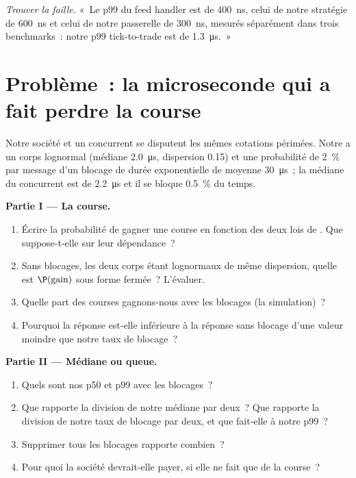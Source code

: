 \begin{exercise}[$\star\star\star$]\label{exo:ll:where-latency-comes-from:8}
\emph{Trouver la faille.} «~Le p99 du feed handler est de \qty{400}{\nano\second}, celui de notre stratégie de \qty{600}{\nano\second}
et celui de notre passerelle de \qty{300}{\nano\second}, mesurés séparément dans trois benchmarks~: notre p99 tick-to-trade est de
\qty{1.3}{\micro\second}.~»
\end{exercise}

\section{Problème~: la microseconde qui a fait perdre la course}

\begin{problem}\label{pb:ll:where-latency-comes-from:1}
Notre société et un concurrent se disputent les mêmes cotations périmées. Notre  a un corps lognormal (médiane
\qty{2.0}{\micro\second}, dispersion 0.15) et une probabilité de 2~\% par message d'un blocage de durée exponentielle de moyenne
\qty{30}{\micro\second}~; la médiane du concurrent est de \qty{2.2}{\micro\second} et il se bloque 0.5~\% du temps.

\medskip\noindent\textbf{Partie I --- La course.}
\begin{enumerate}
\item Écrire la probabilité de gagner une course en fonction des deux lois de . Que suppose-t-elle sur
leur dépendance~?
\item Sans blocages, les deux corps étant lognormaux de même dispersion, quelle est $\P(\text{gain})$ sous forme fermée~?
L'évaluer.
\item Quelle part des courses gagnons-nous avec les blocages (la simulation)~?
\item Pourquoi la réponse est-elle inférieure à la réponse sans blocage d'une valeur moindre que notre taux de blocage~?
\end{enumerate}

\medskip\noindent\textbf{Partie II --- Médiane ou queue.}
\begin{enumerate}[resume]
\item Quels sont nos p50 et p99 avec les blocages~?
\item Que rapporte la division de notre médiane par deux~? Que rapporte la division de notre taux de blocage par deux, et que fait-elle à notre p99~?
\item Supprimer tous les blocages rapporte combien~?
\item Pour quoi la société devrait-elle payer, si elle ne fait que de la course~?
\end{enumerate}


\end{problem}
